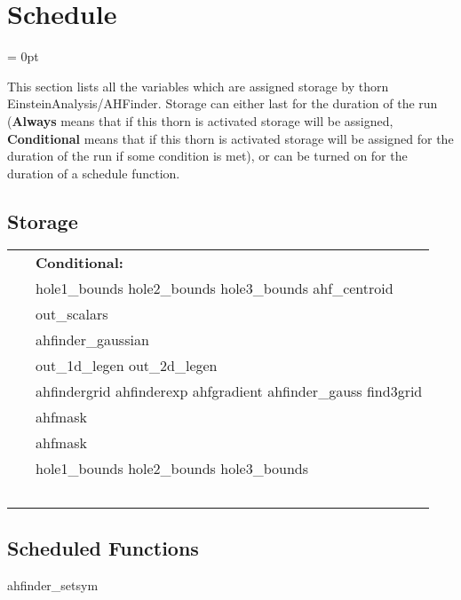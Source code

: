 
\section{Schedule} 


\parskip = 0pt


\noindent This section lists all the variables which are assigned storage by thorn EinsteinAnalysis/AHFinder.  Storage can either last for the duration of the run ({\bf Always} means that if this thorn is activated storage will be assigned, {\bf Conditional} means that if this thorn is activated storage will be assigned for the duration of the run if some condition is met), or can be turned on for the duration of a schedule function.


\subsection*{Storage}

\hspace{5mm}

 \begin{tabular*}{160mm}{ll} 
~& {\bf Conditional:} \\ 
~ &  hole1\_bounds hole2\_bounds hole3\_bounds ahf\_centroid\\ 
~ &  out\_scalars\\ 
~ &  ahfinder\_gaussian\\ 
~ &  out\_1d\_legen out\_2d\_legen\\ 
~ &  ahfindergrid ahfinderexp ahfgradient ahfinder\_gauss find3grid\\ 
~ &  ahfmask\\ 
~ &  ahfmask\\ 
~ &  hole1\_bounds hole2\_bounds hole3\_bounds\\ 
~ & ~\\ 
\end{tabular*} 


\subsection*{Scheduled Functions}
\vspace{5mm}


\hspace{5mm} ahfinder\_setsym 

\hspace{5mm}{\it set symmetries for ahfinder grid functions } 


\hspace{5mm}

